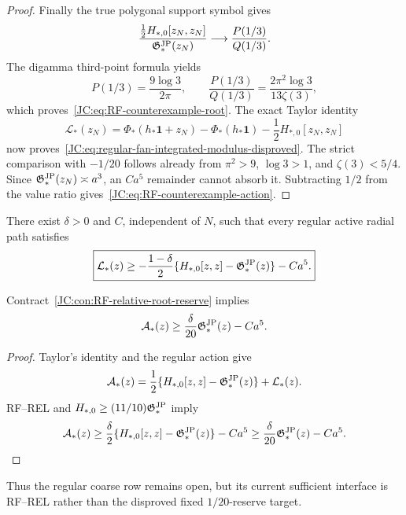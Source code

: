 \begin{contract}
\begin{proof}
Finally the true polygonal support symbol gives
\[
 \frac{\frac12H_{*,0}[z_N,z_N]}{\mathfrak G^{\rm JP}_*(z_N)}
 \longrightarrow\frac{P(1/3)}{Q(1/3)}.
\]
The digamma third-point formula yields
\[
 P(1/3)=\frac{9\log3}{2\pi},\qquad
 \frac{P(1/3)}{Q(1/3)}
 =\frac{2\pi^2\log3}{13\zeta(3)},
\]
which proves~\eqref{JC:eq:RF-counterexample-root}.  The exact Taylor identity
\[
 \mathcal L_*(z_N)
 =\Phi_*(h_*\mathbf1+z_N)-\Phi_*(h_*\mathbf1)
 -\frac12H_{*,0}[z_N,z_N]
\]
now proves~\eqref{JC:eq:regular-fan-integrated-modulus-disproved}.  The strict
comparison with \(-1/20\) follows already from
\(\pi^2>9\), \(\log3>1\), and \(\zeta(3)<5/4\).  Since
\(\mathfrak G^{\rm JP}_*(z_N)\asymp a^3\), an \(Ca^5\) remainder cannot absorb it.
Subtracting \(1/2\) from the value ratio gives~\eqref{JC:eq:RF-counterexample-action}.
\end{proof}

\begin{contract}
\label{JC:con:RF-relative-root-reserve}
There exist \(\delta>0\) and \(C\), independent of \(N\), such that every
regular active radial path satisfies
\begin{equation}\label{JC:eq:RF-relative-root-reserve}
 \boxed{\mathcal L_*(z)\ge-\frac{1-\delta}{2}
 \{H_{*,0}[z,z]-\mathfrak G^{\rm JP}_*(z)\}-Ca^5.}
\end{equation}
\end{contract}

\begin{lemma}
\label{JC:lem:RF-relative-implies-Bregman}
Contract~\ref{JC:con:RF-relative-root-reserve} implies
\[
 \mathcal{A}_*(z)\ge\frac{\delta}{20}\mathfrak G^{\rm JP}_*(z)-Ca^5.
\]
\end{lemma}

\begin{proof}
Taylor's identity and the regular action give
\[
 \mathcal{A}_*(z)
 =\frac12\{H_{*,0}[z,z]-\mathfrak G^{\rm JP}_*(z)\}+\mathcal L_*(z).
\]
RF--REL and
\(H_{*,0}\ge(11/10)\mathfrak G^{\rm JP}_*\) imply
\[
 \mathcal{A}_*(z)
 \ge\frac{\delta}{2}\{H_{*,0}[z,z]-\mathfrak G^{\rm JP}_*(z)\}-Ca^5
 \ge\frac{\delta}{20}\mathfrak G^{\rm JP}_*(z)-Ca^5.
\]
\end{proof}

Thus the regular coarse row remains open, but its current sufficient
interface is RF--REL rather than the disproved fixed \(1/20\)-reserve
target.


\end{contract}
